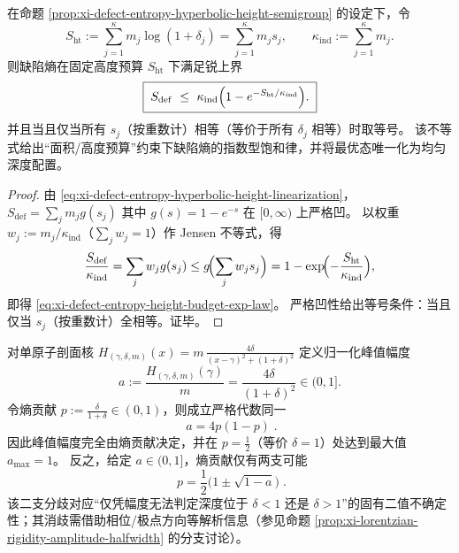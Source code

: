 \begin{corollary}\label{cor:xi-defect-entropy-height-budget-exponential-law}
在命题 \ref{prop:xi-defect-entropy-hyperbolic-height-semigroup} 的设定下，令
\[
S_{\mathrm{ht}}:=\sum_{j=1}^{\kappa}m_j\log(1+\delta_j)=\sum_{j=1}^{\kappa}m_j s_j,
\qquad
\kappa_{\mathrm{ind}}:=\sum_{j=1}^{\kappa}m_j.
\]
则缺陷熵在固定高度预算 \(S_{\mathrm{ht}}\) 下满足锐上界
\begin{equation}\label{eq:xi-defect-entropy-height-budget-exp-law}
\boxed{\;
S_{\mathrm{def}}
\ \le\
\kappa_{\mathrm{ind}}\Bigl(1-e^{-S_{\mathrm{ht}}/\kappa_{\mathrm{ind}}}\Bigr).\;}
\end{equation}
并且当且仅当所有 \(s_j\)（按重数计）相等（等价于所有 \(\delta_j\) 相等）时取等号。
该不等式给出“面积/高度预算”约束下缺陷熵的指数型饱和律，并将最优态唯一化为均匀深度配置。
\end{corollary}
\begin{proof}
由 \eqref{eq:xi-defect-entropy-hyperbolic-height-linearization}，
\(
S_{\mathrm{def}}=\sum_j m_j g(s_j)
\)
其中 \(g(s)=1-e^{-s}\) 在 \([0,\infty)\) 上严格凹。
以权重 \(w_j:=m_j/\kappa_{\mathrm{ind}}\)（\(\sum_j w_j=1\)）作 Jensen 不等式，得
\[
\frac{S_{\mathrm{def}}}{\kappa_{\mathrm{ind}}}
=\sum_j w_j g(s_j)
\le g\!\Bigl(\sum_j w_j s_j\Bigr)
=1-\exp\!\Bigl(-\frac{S_{\mathrm{ht}}}{\kappa_{\mathrm{ind}}}\Bigr),
\]
即得 \eqref{eq:xi-defect-entropy-height-budget-exp-law}。
严格凹性给出等号条件：当且仅当 \(s_j\)（按重数计）全相等。证毕。
\end{proof}

\begin{corollary}\label{cor:xi-detectability-amplitude-is-quadratic-image}
对单原子剖面核
\(
H_{(\gamma,\delta,m)}(x)=m\,\frac{4\delta}{(x-\gamma)^2+(1+\delta)^2}
\)
定义归一化峰值幅度
\[
a:=\frac{H_{(\gamma,\delta,m)}(\gamma)}{m}=\frac{4\delta}{(1+\delta)^2}\in(0,1].
\]
令熵贡献
\(
p:=\frac{\delta}{1+\delta}\in(0,1)
\)，则成立严格代数同一
\begin{equation}\label{eq:xi-amplitude-as-quadratic-image-of-entropy}
\boxed{\;
a=4p(1-p)\; }.
\end{equation}
因此峰值幅度完全由熵贡献决定，并在 \(p=\tfrac12\)（等价 \(\delta=1\)）处达到最大值 \(a_{\max}=1\)。
反之，给定 \(a\in(0,1]\)，熵贡献仅有两支可能
\begin{equation}\label{eq:xi-entropy-from-amplitude-two-branches}
\boxed{\;
p=\frac12\bigl(1\pm\sqrt{1-a}\bigr)\; }.
\end{equation}
该二支分歧对应“仅凭幅度无法判定深度位于 \(\delta<1\) 还是 \(\delta>1\)”的固有二值不确定性；其消歧需借助相位/极点方向等解析信息（参见命题 \ref{prop:xi-lorentzian-rigidity-amplitude-halfwidth} 的分支讨论）。
\end{corollary}

